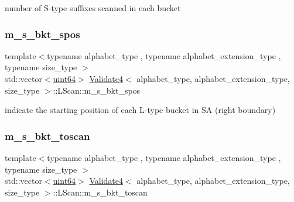 number of S-\/type suffixes scanned in each bucket 

\mbox{\label{struct_validate4_1_1_l_scan_a3a342dcdec25a509df8f943c1e91b3b8}} 
\subsubsection{\texorpdfstring{m\+\_\+s\+\_\+bkt\+\_\+spos}{m\_s\_bkt\_spos}}
{\footnotesize\ttfamily template$<$typename alphabet\+\_\+type , typename alphabet\+\_\+extension\+\_\+type , typename size\+\_\+type $>$ \\
std\+::vector$<$\hyperlink{types_8h_a60e8696a4678cd348e991a1f172e53f7}{uint64}$>$ \hyperlink{class_validate4}{Validate4}$<$ alphabet\+\_\+type, alphabet\+\_\+extension\+\_\+type, size\+\_\+type $>$\+::L\+Scan\+::m\+\_\+s\+\_\+bkt\+\_\+spos\hspace{0.3cm}{\ttfamily [private]}}



indicate the starting position of each L-\/type bucket in SA (right boundary) 

\mbox{\label{struct_validate4_1_1_l_scan_ad072911a65100e41a34b17ee6dc79cd4}} 
\subsubsection{\texorpdfstring{m\+\_\+s\+\_\+bkt\+\_\+toscan}{m\_s\_bkt\_toscan}}
{\footnotesize\ttfamily template$<$typename alphabet\+\_\+type , typename alphabet\+\_\+extension\+\_\+type , typename size\+\_\+type $>$ \\
std\+::vector$<$\hyperlink{types_8h_a60e8696a4678cd348e991a1f172e53f7}{uint64}$>$ \hyperlink{class_validate4}{Validate4}$<$ alphabet\+\_\+type, alphabet\+\_\+extension\+\_\+type, size\+\_\+type $>$\+::L\+Scan\+::m\+\_\+s\+\_\+bkt\+\_\+toscan\hspace{0.3cm}{\ttfamily [private]}}




